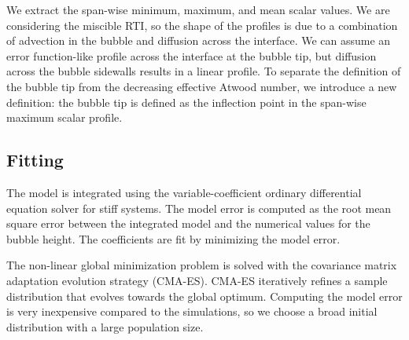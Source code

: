 We extract the span-wise minimum, maximum, and mean scalar values.
We are considering the miscible RTI, so the shape of the profiles is due to a combination of advection in the bubble and diffusion across the interface.
We can assume an error function-like profile across the interface at the bubble tip, but diffusion across the bubble sidewalls results in a linear profile.
To separate the definition of the bubble tip from the decreasing effective Atwood number, we introduce a new definition: the bubble tip is defined as the inflection point in the span-wise maximum scalar profile.

\subsection{Fitting}

The model is integrated using the variable-coefficient ordinary differential equation solver for stiff systems.
The model error is computed as the root mean square error between the integrated model and the numerical values for the bubble height.
The coefficients are fit by minimizing the model error.

The non-linear global minimization problem is solved with the covariance matrix adaptation evolution strategy (CMA-ES).
CMA-ES iteratively refines a sample distribution that evolves towards the global optimum.
Computing the model error is very inexpensive compared to the simulations, so we choose a broad initial distribution with a large population size.

